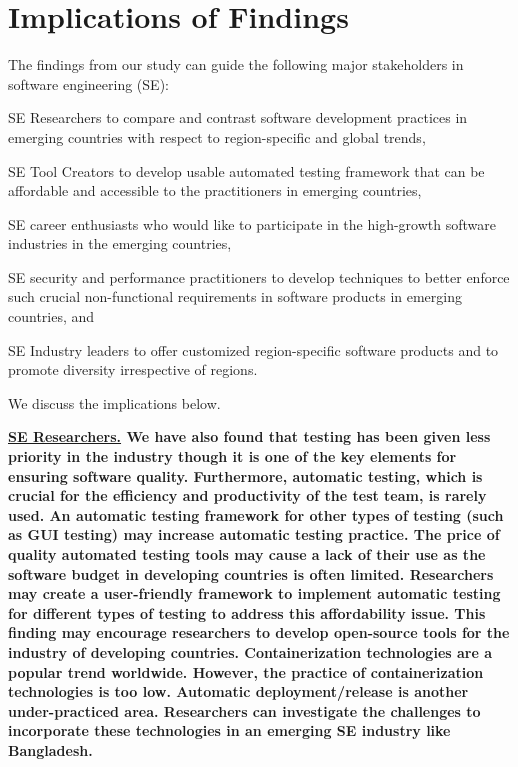 \section{Implications of Findings}\label{implications}
The findings from our study can guide the following major stakeholders in software engineering (SE): 
\begin{inparaenum}[(1)]
\item SE Researchers to compare and contrast software development practices in emerging countries with respect to region-specific and global trends,   
\item SE Tool Creators to develop usable automated testing framework that can be affordable and accessible to the practitioners in emerging countries,     
\item SE career enthusiasts who would like to participate in the high-growth software industries in the emerging countries,    
\item SE security and performance practitioners to develop techniques to better enforce such crucial non-functional requirements in software products in emerging countries, and  
\item SE Industry leaders to offer customized region-specific software products and to promote diversity irrespective of regions.   
\end{inparaenum} We discuss the implications below.

\bf{\ul{SE Researchers.}}  We
have also found that testing has been given less priority in the industry though
it is one of the key elements for ensuring software quality. Furthermore,
automatic testing, which is crucial for the efficiency and productivity of the
test team, is rarely used. An automatic testing framework for other types of
testing (such as GUI testing) may increase automatic testing practice. The price
of quality automated testing tools may cause a lack of their use as the software
budget in developing countries is often limited. Researchers may create a
user-friendly framework to implement automatic testing for different types of
testing to address this affordability issue. This finding may encourage
researchers to develop open-source tools for the industry of developing
countries. Containerization technologies are a popular trend worldwide. However, the
practice of containerization technologies is too low. Automatic
deployment/release is another under-practiced area. Researchers can investigate
the challenges to incorporate these technologies in an emerging SE industry like
Bangladesh.

